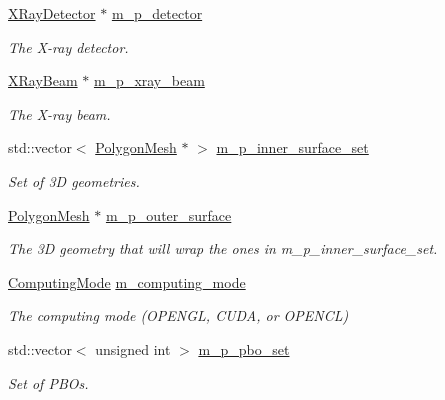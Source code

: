 \begin{DoxyCompactItemize}
\item 
\hyperlink{classg_virtual_x_ray_1_1_x_ray_detector}{XRayDetector} $\ast$ \hyperlink{classg_virtual_x_ray_1_1_x_ray_renderer_abe635fe1136fa3936fd5439cf888aad9}{m\_\-p\_\-detector}
\begin{DoxyCompactList}\small\item\em The X-\/ray detector. \end{DoxyCompactList}\item 
\hyperlink{classg_virtual_x_ray_1_1_x_ray_beam}{XRayBeam} $\ast$ \hyperlink{classg_virtual_x_ray_1_1_x_ray_renderer_a10326c78ad5b1ff35d529efa4212aa78}{m\_\-p\_\-xray\_\-beam}
\begin{DoxyCompactList}\small\item\em The X-\/ray beam. \end{DoxyCompactList}\item 
std::vector$<$ \hyperlink{class_graphics_1_1_polygon_mesh}{PolygonMesh} $\ast$ $>$ \hyperlink{classg_virtual_x_ray_1_1_x_ray_renderer_a18d3b60ab79b39221526a490935e955f}{m\_\-p\_\-inner\_\-surface\_\-set}
\begin{DoxyCompactList}\small\item\em Set of 3D geometries. \end{DoxyCompactList}\item 
\hyperlink{class_graphics_1_1_polygon_mesh}{PolygonMesh} $\ast$ \hyperlink{classg_virtual_x_ray_1_1_x_ray_renderer_a4d31028c769154394e7815f39c164bc7}{m\_\-p\_\-outer\_\-surface}
\begin{DoxyCompactList}\small\item\em The 3D geometry that will wrap the ones in m\_\-p\_\-inner\_\-surface\_\-set. \end{DoxyCompactList}\item 
\hyperlink{classg_virtual_x_ray_1_1_x_ray_renderer_af306d3bab294f730af5a692f716c9f81}{ComputingMode} \hyperlink{classg_virtual_x_ray_1_1_x_ray_renderer_acd744ca8277894c4e33c580c64e809b0}{m\_\-computing\_\-mode}
\begin{DoxyCompactList}\small\item\em The computing mode (OPENGL, CUDA, or OPENCL) \end{DoxyCompactList}\item 
std::vector$<$ unsigned int $>$ \hyperlink{classg_virtual_x_ray_1_1_x_ray_renderer_a3c98784b4ffd06d7dac0c43e20713b14}{m\_\-p\_\-pbo\_\-set}
\begin{DoxyCompactList}\small\item\em Set of PBOs. \end{DoxyCompactList}\item 

\end{DoxyCompactItemize}
